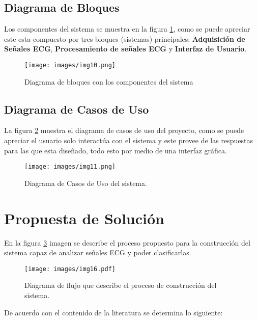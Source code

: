\subsection{Diagrama de Bloques}

Los componentes del sistema se muestra en la figura \ref{fig:Bloques}, como se puede apreciar este esta compuesto por tres bloques (sistemas) principales: \textbf{Adquisición de Señales ECG}, \textbf{Procesamiento de señales ECG} y \textbf{Interfaz de Usuario}.

\begin{figure}[!h]
    \centering
    \texttt{[image: images/img10.png]}
    \caption{Diagrama de bloques con los componentes del sistema}
    \label{fig:Bloques}
\end{figure}


\subsection{Diagrama de Casos de Uso}

La figura \ref{fig:Casos_uso} muestra el diagrama de casos de uso del proyecto, como se puede apreciar el usuario solo interactúa con el sistema y este provee de las respuestas para las que esta diseñado, todo esto por medio de una interfaz gráfica.\\


\begin{figure}[!h]
    \centering
    \texttt{[image: images/img11.png]}
    \caption{Diagrama de Casos de Uso del sistema.}
    \label{fig:Casos_uso}
\end{figure}


\section{Propuesta de Solución}

En la figura \ref{fig:Flow} imagen se describe el proceso propuesto para la construcción del sistema capaz de analizar señales ECG y poder clasificarlas.

\begin{figure}[!ht]
    \centering
    \texttt{[image: images/img16.pdf]}
    \caption{Diagrama de flujo que describe el proceso de construcción del sistema.}
    \label{fig:Flow}
\end{figure}

De acuerdo con el contenido de la literatura se determina lo siguiente:

